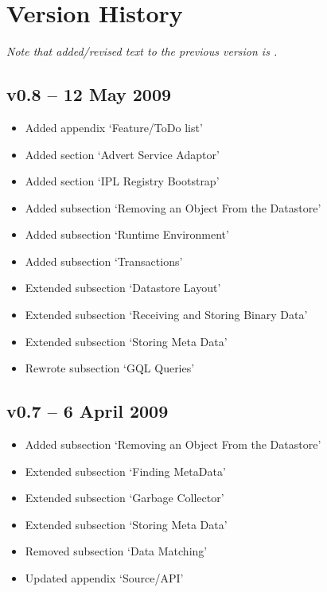 \section{Version History}
\emph{Note that added/revised text to the previous version is .}

\subsection*{v0.8 -- 12 May 2009}
\begin{itemize}
  \item Added appendix `Feature/ToDo list'
  \item Added section `Advert Service Adaptor'
  \item Added section `IPL Registry Bootstrap'
  \item Added subsection `Removing an Object From the Datastore'
  \item Added subsection `Runtime Environment'
  \item Added subsection `Transactions'
  \item Extended subsection `Datastore Layout'
  \item Extended subsection `Receiving and Storing Binary Data'
  \item Extended subsection `Storing Meta Data'
  \item Rewrote subsection `GQL Queries'
\end{itemize}

\subsection*{v0.7 -- 6 April 2009}
\begin{itemize}
  \item Added subsection `Removing an Object From the Datastore'
  \item Extended subsection `Finding MetaData'
  \item Extended subsection `Garbage Collector'
  \item Extended subsection `Storing Meta Data'
  \item Removed subsection `Data Matching'
  \item Updated appendix `Source/API'
\end{itemize}

